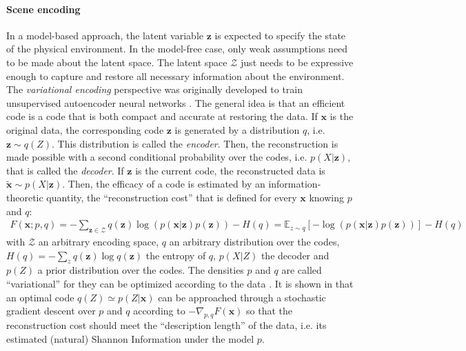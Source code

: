 \documentclass{article}
\begin{document}
\paragraph{Scene encoding}\label{sec:encoding}
In a model-based approach, the latent variable $\boldsymbol{z}$ is expected to specify the state of the physical environment. In the model-free case, only weak assumptions need to be made about the latent space.  The latent space $\mathcal{Z}$ just needs to be expressive enough to capture and restore all necessary information about the environment.  The \emph{variational encoding} perspective  was originally developed 
to train unsupervised autoencoder neural networks \citep{hinton2006reducing}. The general idea is that an efficient code 
is a code that is both compact and accurate at restoring the data. 
If $\boldsymbol{x}$ is the original data, the corresponding code $\boldsymbol{z}$ is generated by a distribution $q$, i.e. $\boldsymbol{z} \sim q(Z)$. This distribution is called the \emph{encoder}. Then, the reconstruction is made possible with a second conditional probability over the codes, i.e. $p(X|\boldsymbol{z})$, that is called the \emph{decoder}. If $\boldsymbol{z}$ is the current code, the reconstructed data is $\tilde{\boldsymbol{x}} \sim p(X|\boldsymbol{z})$. 
Then, the efficacy of a code is estimated by an information-theoretic quantity, the ``reconstruction cost'' \cite{hinton1994autoencoders} that is defined for every $\boldsymbol{x}$ knowing $p$ and $q$:
\begin{align}
F(\boldsymbol{x};p,q) = - \sum_{\boldsymbol{z} \in \mathcal{Z}} q(\boldsymbol{z}) \log (p(\boldsymbol{x}|\boldsymbol{z})p(\boldsymbol{z})) - H(q)
= \mathbb{E}_{z\sim q} \left[-\log (p(\boldsymbol{x}|\boldsymbol{z})p(\boldsymbol{z}))\right] - H(q)
\label{eq:FEP-energy}
\end{align}
with $\mathcal{Z}$ an arbitrary encoding space, $q$ an arbitrary distribution over the codes, $H(q) = -\sum_z q(\boldsymbol{z}) \log q(\boldsymbol{z})$ the entropy of $q$, $p(X|Z)$ the decoder and $p(Z)$ a prior distribution over the codes.
The densities $p$ and $q$ are called ``variational'' for they can be optimized according to the data \cite{hinton2006fast,kingma2013auto}.  
It is shown in \cite{kingma2013auto} that an optimal code $q(Z)\simeq p(Z|\boldsymbol{x})$ can be approached through a stochastic gradient descent over $p$ and $q$ according to $-\nabla_{p,q} F(\boldsymbol{x}) $	so that the reconstruction cost should meet the ``description length'' of the data, i.e. its estimated (natural) Shannon Information under the model $p$.
\end{document}
